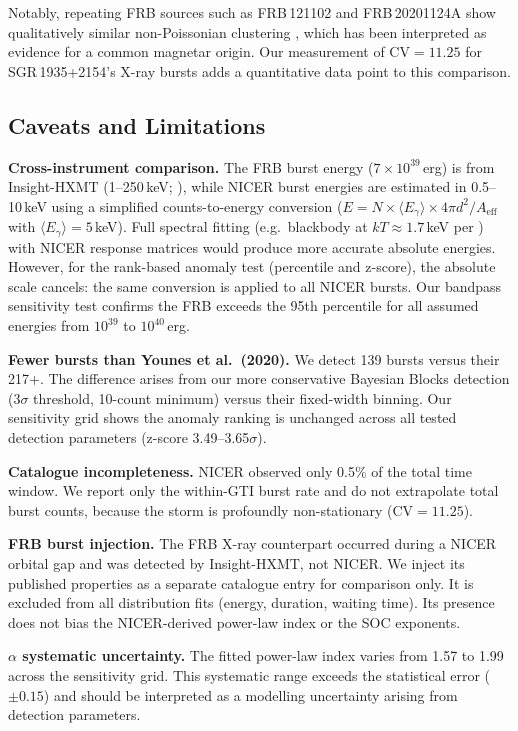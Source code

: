 \documentclass[12pt]{article}
\begin{document}
Notably, repeating FRB sources such as FRB\,121102 and FRB\,20201124A show qualitatively similar non-Poissonian clustering \citep{chime2020}, which has been interpreted as evidence for a common magnetar origin. Our measurement of $\mathrm{CV} = 11.25$ for SGR\,1935+2154's X-ray bursts adds a quantitative data point to this comparison.

\subsection{Caveats and Limitations}

\textbf{Cross-instrument comparison.} The FRB burst energy
($7 \times 10^{39}$\,erg) is from Insight-HXMT (1--250\,keV;
\citealt{li2021}), while NICER burst energies are estimated in
0.5--10\,keV using a simplified counts-to-energy conversion
($E = N \times \langle E_\gamma \rangle \times 4\pi d^2 / A_{\mathrm{eff}}$
with $\langle E_\gamma \rangle = 5$\,keV). Full spectral fitting
(e.g.\ blackbody at $kT \approx 1.7$\,keV per \citealt{younes2020})
with NICER response matrices would produce more accurate absolute energies.
However, for the rank-based anomaly test (percentile and z-score), the
absolute scale cancels: the same conversion is applied to all NICER
bursts. Our bandpass sensitivity test confirms the FRB exceeds the 95th
percentile for all assumed energies from $10^{39}$ to $10^{40}$\,erg.

\textbf{Fewer bursts than Younes et al.\ (2020).} We detect 139 bursts
versus their 217+. The difference arises from our more conservative
Bayesian Blocks detection ($3\sigma$ threshold, 10-count minimum) versus
their fixed-width binning. Our sensitivity grid shows the anomaly
ranking is unchanged across all tested detection parameters
(z-score 3.49--3.65$\sigma$).

\textbf{Catalogue incompleteness.} NICER observed only 0.5\% of the
total time window. We report only the within-GTI burst rate and do not
extrap\-olate total burst counts, because the storm is profoundly
non-stationary ($\mathrm{CV} = 11.25$).

\textbf{FRB burst injection.} The FRB X-ray counterpart occurred
during a NICER orbital gap and was detected by Insight-HXMT, not NICER.
We inject its published properties as a separate catalogue entry
for comparison only. It is excluded from all distribution fits
(energy, duration, waiting time). Its presence does not bias the
NICER-derived power-law index or the SOC exponents.

\textbf{$\alpha$ systematic uncertainty.} The fitted power-law index
varies from 1.57 to 1.99 across the sensitivity grid. This systematic
range exceeds the statistical error ($\pm 0.15$) and should be
interpreted as a modelling uncertainty arising from detection parameters.
\end{document}
